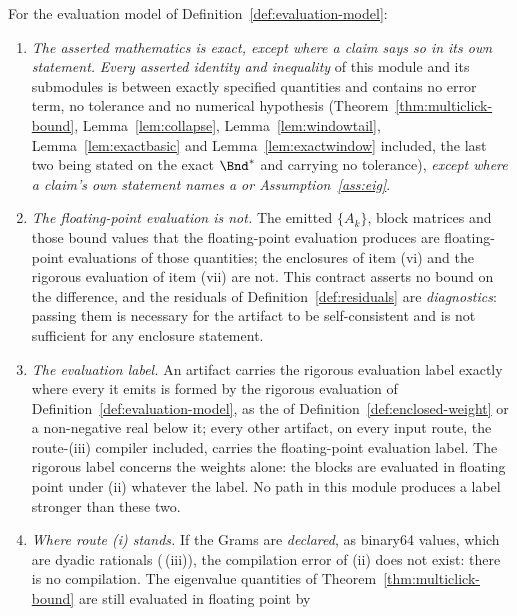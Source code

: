 \begin{theorem}\label{thm:exact-and-evaluated}
For the evaluation model of Definition~\ref{def:evaluation-model}:
\begin{enumerate}[label=(\roman*),leftmargin=3.0em]
\item \emph{The asserted mathematics is exact, except where a claim says so in
  its own statement.} \emph{Every asserted identity and inequality} of this
  module and its submodules is between exactly specified quantities and
  contains no error term, no tolerance and no numerical hypothesis
  (Theorem~\ref{thm:multiclick-bound}, Lemma~\ref{lem:collapse},
  Lemma~\ref{lem:windowtail}, Lemma~\ref{lem:exactbasic} and
  Lemma~\ref{lem:exactwindow} included, the last two being stated on the exact
  $\Bnd^{\ast}$ and carrying no tolerance), \emph{except where a claim's own
  statement names a  or
  Assumption~\ref{ass:eig}}.
\item \emph{The floating-point evaluation is not.} The emitted $\{A_k\}$,
  block matrices and those bound values that the floating-point evaluation
  produces are floating-point evaluations of those quantities; the enclosures
  of item (vi) and the rigorous evaluation of item (vii) are not. This
  contract asserts no bound on the difference, and the residuals of
  Definition~\ref{def:residuals} are \emph{diagnostics}: passing them is
  necessary for the artifact to be self-consistent and is not sufficient for
  any enclosure statement.
\item \emph{The evaluation label.} An artifact carries the rigorous evaluation
  label exactly where every  it emits is formed by the
  rigorous evaluation of Definition~\ref{def:evaluation-model}, as the
   of Definition~\ref{def:enclosed-weight} or a
  non-negative real below it; every other artifact, on every input route, the
  route-(iii) compiler included, carries the floating-point evaluation label.
  The rigorous label concerns the weights alone: the blocks are evaluated in
  floating point under (ii) whatever the label. No path in this module
  produces a label stronger than these two.
\item \emph{Where route (i) stands.} If the Grams are \emph{declared}, as
  binary64 values, which are dyadic rationals
  (\,(iii)), the compilation error of (ii) does
  not exist: there is no compilation. The eigenvalue quantities of
  Theorem~\ref{thm:multiclick-bound} are still evaluated in floating point by

\end{enumerate}
\end{theorem}
